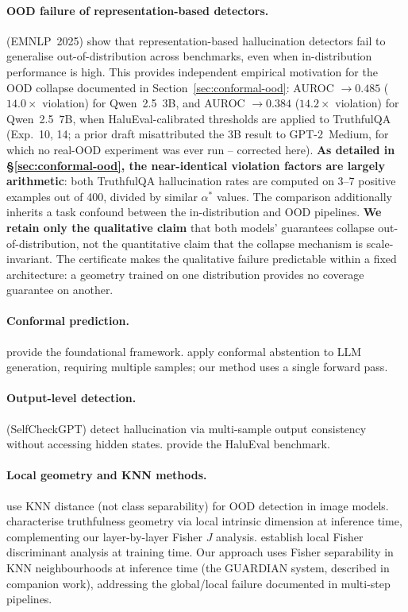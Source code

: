 \documentclass[10pt,twocolumn]{article}
\begin{document}
\paragraph{OOD failure of representation-based detectors.}
\citet{dubanowska2025ood} (EMNLP~2025) show that representation-based
hallucination detectors fail to generalise out-of-distribution across
benchmarks, even when in-distribution performance is high. This
provides independent empirical motivation for the OOD collapse
documented in Section~\ref{sec:conformal-ood}: AUROC $\to 0.485$
($14.0\times$ violation) for Qwen~2.5~3B, and AUROC $\to 0.384$
($14.2\times$ violation) for Qwen~2.5~7B, when HaluEval-calibrated
thresholds are applied to TruthfulQA (Exp.~10, 14; a prior draft
misattributed the 3B result to GPT-2~Medium, for which no real-OOD
experiment was ever run -- corrected here). \textbf{As detailed in
\S\ref{sec:conformal-ood}, the near-identical violation factors are
largely arithmetic}: both TruthfulQA hallucination rates are computed
on 3--7 positive examples out of 400, divided by similar $\alpha^*$
values. The comparison additionally inherits a task confound between
the in-distribution and OOD pipelines. \textbf{We retain only the
qualitative claim} that both models' guarantees collapse
out-of-distribution, not the quantitative claim that the collapse
mechanism is scale-invariant. The certificate makes the qualitative
failure predictable within a fixed architecture: a geometry trained on
one distribution provides no coverage guarantee on another.

\paragraph{Conformal prediction.}
\citet{angelopoulos2022} provide the foundational framework.
\citet{abbasi2024conformal} apply conformal abstention to LLM generation,
requiring multiple samples; our method uses a single forward pass.

\paragraph{Output-level detection.}
\citet{manakul2023selfcheckgpt} (SelfCheckGPT) detect hallucination via
multi-sample output consistency without accessing hidden states.
\citet{li2023halueval} provide the HaluEval benchmark.

\paragraph{Local geometry and KNN methods.}
\citet{sun2022ood} use KNN distance (not class separability) for OOD
detection in image models.  \citet{yin2024characterizing} characterise
truthfulness geometry via local intrinsic dimension at inference time,
complementing our layer-by-layer Fisher $J$ analysis.
\citet{sugiyama2007} establish local Fisher discriminant analysis at
training time.  Our approach uses Fisher
separability in KNN neighbourhoods at inference time (the GUARDIAN system,
described in companion work), addressing the global/local failure documented
in multi-step pipelines.
\end{document}
